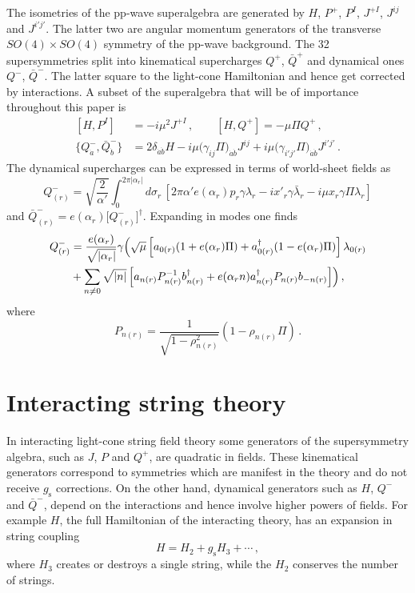 \documentclass[12pt]{article}
\def\da{\dot{a}}
\def\db{\dot{b}}
\def\a{\alpha}
\def\g{\gamma}
\def\d{\delta}
\def\m{\mu}
\def\s{\sigma}
\def\l{\lambda}
\def\dg{\dagger}
\numberwithin{equation}{section} \setlength{\textwidth}{17cm}
\begin{document}
\noindent The isometries of the pp-wave superalgebra are generated by 
$H$, $P^+$, $P^I$, $J^{+I}$,
$J^{ij}$ and $J^{i'j'}$. The latter two are angular momentum generators of the transverse $SO(4)\times SO(4)$ symmetry
of the pp-wave background. The
32 supersymmetries 
split into kinematical supercharges $Q^+$, $\bar{Q}^+$ and dynamical ones 
$Q^-$, $\bar{Q}^-$. The latter square to the light-cone Hamiltonian and
hence get corrected by interactions.
A subset of the superalgebra that will be of
importance throughout this paper
is~\cite{m}
\begin{equation}\label{comm}
\begin{split}
[H,P^I] &= -i\m^2J^{+I}\,,\qquad [H,Q^+]=-\m\Pi Q^+\,,\\
\{Q^-_{\da},\bar{Q}^-_{\db}\} &=
2\d_{\dot{a}\dot{b}}H-i\m\bigl(\g_{ij}\Pi\bigr)_{\dot{a}\dot{b}}J^{ij}
+i\m\bigl(\g_{i'j'}\Pi\bigr)_{\dot{a}\dot{b}}J^{i'j'}\,.
\end{split}
\end{equation}
The dynamical supercharges can be expressed in terms of world-sheet fields 
as
\begin{equation}\label{qfield}
Q^-_{(r)} 
=\sqrt{\frac{2}{\a'}}\int_0^{2\pi|\a_r|}d\s_r\,\left[2\pi\a'e(\a_r)p_r\g\l_r-
ix'_r\g\bar{\l}_r-i\m x_r\g\Pi\l_r\right]
\end{equation}
and $\bar{Q}^-_{(r)}=e(\a_r)\bigl[Q_{(r)}^-\bigr]^{\dg}$.
Expanding in modes one finds
\begin{align}\label{q-mode}
Q^-_{(r)}& = \frac{e(\a_r)}{\sqrt{|\a_r|}}\g
\Bigl(\sqrt{\m}\left[a_{0(r)}(1+e(\a_r)\Pi)+a_{0(r)}^{\dg}(1-e(\a_r)\Pi)\right]\l_{0(r)}
\nonumber\\
&+\sum_{n\neq 0}\sqrt{|n|}\left[a_{n(r)}P_{n(r)}^{-1}b_{n(r)}^{\dg}
+e(\a_rn)a_{n(r)}^{\dg}P_{n(r)}b_{-n(r)}\right]\Bigr)\,,
\end{align}
where
\begin{equation}
P_{n(r)}=\frac{1}{\sqrt{1-\rho_{n(r)}^2}}(1-\rho_{n(r)}\Pi)\,.
\end{equation}
\section{Interacting string theory}\label{sec3}
In interacting light-cone string field theory some generators  of the
supersymmetry algebra, such as $J$, $P$ and $Q^+$, are quadratic in fields. These kinematical generators correspond to 
symmetries which are manifest in the theory and do not receive $g_{\text{s}}$
corrections. On the other hand, dynamical generators such as $H$, $Q^-$ and $\bar{Q}^-$, depend on the interactions
and hence involve higher powers of fields. 
For example $H$, the full Hamiltonian of the interacting theory, has an expansion in string coupling
\begin{equation}
H=H_2+g_{\text{s}}H_3+\cdots\,,
\end{equation}
where $H_3$ creates or destroys a single string, while the $H_2$ conserves 
the number of strings. 
\end{document}
